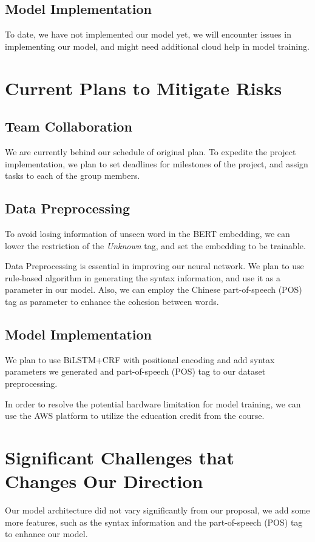 \documentclass[11pt]{article}
\begin{document}
\subsection{Model Implementation}

To date, we have not implemented our model yet, we will encounter issues in implementing our model, and might need additional cloud help in model training.

\section{Current Plans to Mitigate Risks}

\subsection{Team Collaboration}

We are currently behind our schedule of original plan. To expedite the project implementation, we plan to set deadlines for milestones of the project, and assign tasks to each of the group members.  

\subsection{Data Preprocessing}

To avoid losing information of unseen word in the BERT embedding, we can lower the restriction of the \textit{Unknown} tag, and set the embedding to be trainable. 

Data Preprocessing is essential in improving our neural network. We plan to use rule-based algorithm in generating the syntax information, and use it as a parameter in our model. Also, we can employ the Chinese part-of-speech (POS) tag as parameter to enhance the cohesion between words.

\subsection{Model Implementation}

We plan to use BiLSTM+CRF with positional encoding and add syntax parameters we generated and part-of-speech (POS) tag to our dataset preprocessing.

In order to resolve the potential hardware limitation for model training, we can use the AWS platform to utilize the education credit from the course.

\section{Significant Challenges that Changes Our Direction}

Our model architecture did not vary significantly from our proposal, we add some more features, such as the syntax information and the part-of-speech (POS) tag to enhance our model. 
\end{document}
